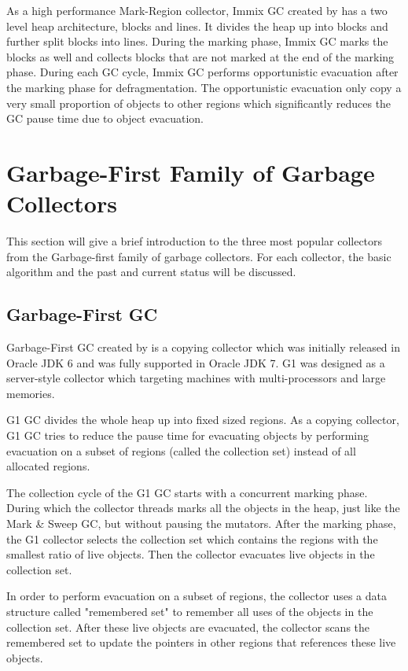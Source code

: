 As a high performance Mark-Region collector, Immix GC created by \cite{blackburn2008immix}
has a two level heap architecture, blocks and lines. It divides the heap up into blocks and
further split blocks into lines. During the marking phase, Immix GC marks the blocks
as well and collects blocks that are not marked at the end of the marking phase.
During each GC cycle, Immix GC performs opportunistic evacuation after the marking phase for defragmentation.
The opportunistic evacuation only copy a very small proportion of objects to other regions which significantly
reduces the GC pause time due to object evacuation.

\section{Garbage-First Family of Garbage Collectors}
\label{sec:g1collectors}

This section will give a brief introduction to the three most popular collectors from the Garbage-first
family of garbage collectors. For each collector, the basic algorithm
and the past and current status will be discussed.

\subsection{Garbage-First GC}

Garbage-First GC created by \cite{detlefs2004garbage} is a copying collector which was initially released in Oracle JDK 6
and was fully supported in Oracle JDK 7. G1 was designed as a server-style collector
which targeting machines with multi-processors and large memories. 

G1 GC divides the whole heap up into fixed sized regions. 
As a copying collector, G1 GC tries to reduce the pause time for evacuating objects
by performing evacuation on a subset of regions (called the collection set) instead of
all allocated regions.

The collection cycle of the G1 GC starts with a concurrent marking phase.
During which the collector threads marks all the objects in the heap, just like the Mark \&
Sweep GC, but without pausing the mutators.
After the marking phase, the G1 collector selects the collection set which contains
the regions with the smallest ratio of live objects.
Then the collector evacuates live objects in the collection set.

In order to perform evacuation on a subset of regions, the collector uses a data structure
called "remembered set" to remember all uses of the objects in the collection set.
After these live objects are evacuated, the collector scans the remembered set to
update the pointers in other regions that references these live objects.

